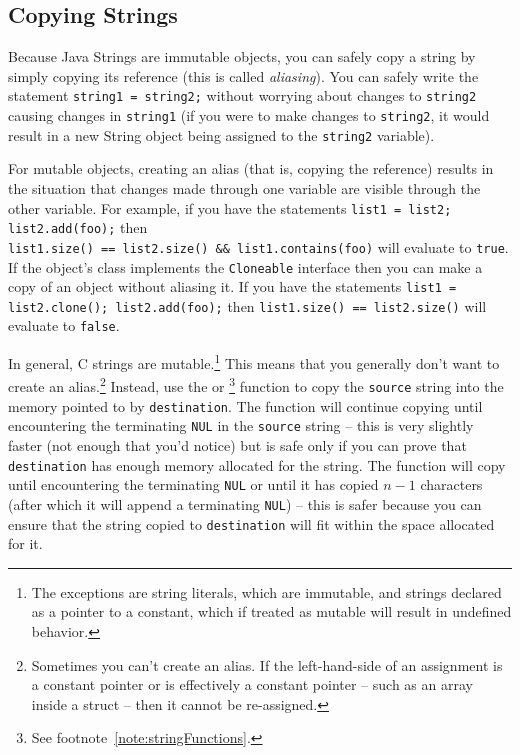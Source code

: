 \subsection{Copying Strings}

Because Java Strings are immutable objects, you can safely copy a string by simply copying its reference (this is called \textit{aliasing}).
You can safely write the statement \lstinline{string1 = string2;} without worrying about changes to \lstinline{string2} causing changes in \lstinline{string1}
(if you were to make changes to \lstinline{string2}, it would result in a new String object being assigned to the \lstinline{string2} variable).

For mutable objects, creating an alias (that is, copying the reference) results in the situation that changes made through one variable are visible through the other variable.
For example, if you have the statements \lstinline{list1 = list2; list2.add(foo);} then \\ \lstinline{list1.size() == list2.size() && list1.contains(foo)} will evaluate to \lstinline{true}.
If the object's class implements the \lstinline{Cloneable} interface then you can make a copy of an object without aliasing it.
If you have the statements \lstinline{list1 = list2.clone(); list2.add(foo);} then \lstinline{list1.size() == list2.size()} will evaluate to \lstinline{false}.

In general, C strings are mutable.\footnote{
    The exceptions are string literals, which are immutable, and strings declared as a pointer to a constant, which if treated as mutable will result in undefined behavior.
}
This means that you generally don't want to create an alias.\footnote{
    Sometimes you can't create an alias.
    If the left-hand-side of an assignment is a constant pointer or is effectively a constant pointer -- such as an array inside a struct -- then it cannot be re-assigned.
}
Instead, use the  or \footnote{See footnote~\ref{note:stringFunctions}.} function to copy the \lstinline{source} string into the memory pointed to by \lstinline{destination}.
The  function will continue copying until encountering the terminating \lstinline{NUL} in the \lstinline{source} string -- this is very slightly faster (not enough that you'd notice) but is safe only if you can prove that \lstinline{destination} has enough memory allocated for the string.
The  function will copy until encountering the terminating \lstinline{NUL} or until it has copied $n-1$ characters (after which it will append a terminating \lstinline{NUL}) -- this is safer because you can ensure that the string copied to \lstinline{destination} will fit within the space allocated for it.


